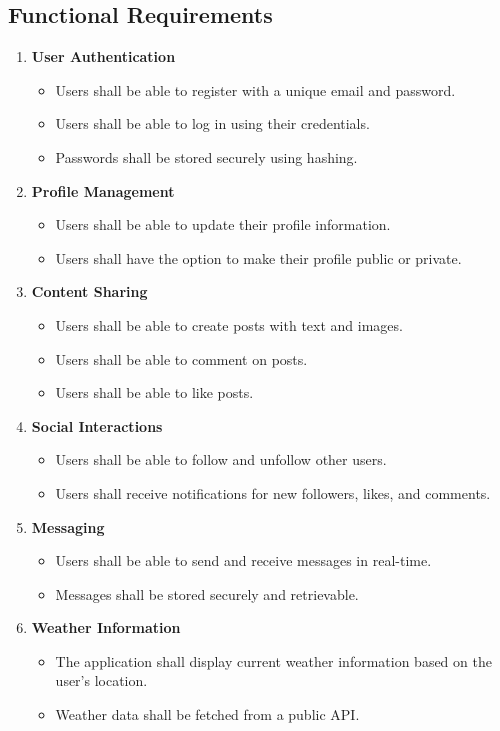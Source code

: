 \documentclass[12pt,a4paper]{report}
\begin{document}
\subsection{Functional Requirements}
\begin{enumerate}
    \item \textbf{User Authentication}
    \begin{itemize}
        \item Users shall be able to register with a unique email and password.
        \item Users shall be able to log in using their credentials.
        \item Passwords shall be stored securely using hashing.
    \end{itemize}
    \item \textbf{Profile Management}
    \begin{itemize}
        \item Users shall be able to update their profile information.
        \item Users shall have the option to make their profile public or private.
    \end{itemize}
    \item \textbf{Content Sharing}
    \begin{itemize}
        \item Users shall be able to create posts with text and images.
        \item Users shall be able to comment on posts.
        \item Users shall be able to like posts.
    \end{itemize}
    \item \textbf{Social Interactions}
    \begin{itemize}
        \item Users shall be able to follow and unfollow other users.
        \item Users shall receive notifications for new followers, likes, and comments.
    \end{itemize}
    \item \textbf{Messaging}
    \begin{itemize}
        \item Users shall be able to send and receive messages in real-time.
        \item Messages shall be stored securely and retrievable.
    \end{itemize}
    \item \textbf{Weather Information}
    \begin{itemize}
        \item The application shall display current weather information based on the user's location.
        \item Weather data shall be fetched from a public API.
    \end{itemize}
\end{enumerate}
\end{document}
